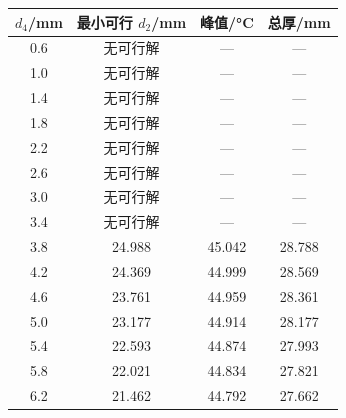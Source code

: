 \begin{tabular}{cccc}
  \toprule
    $d_4$/\si{mm} & 最小可行 $d_2$/\si{mm} & 峰值/\si{\celsius} & 总厚/\si{mm} \\
  \midrule
    0.6 & 无可行解 & --- & --- \\
    1.0 & 无可行解 & --- & --- \\
    1.4 & 无可行解 & --- & --- \\
    1.8 & 无可行解 & --- & --- \\
    2.2 & 无可行解 & --- & --- \\
    2.6 & 无可行解 & --- & --- \\
    3.0 & 无可行解 & --- & --- \\
    3.4 & 无可行解 & --- & --- \\
    3.8 & 24.988 & 45.042 & 28.788 \\
    4.2 & 24.369 & 44.999 & 28.569 \\
    4.6 & 23.761 & 44.959 & 28.361 \\
    5.0 & 23.177 & 44.914 & 28.177 \\
    5.4 & 22.593 & 44.874 & 27.993 \\
    5.8 & 22.021 & 44.834 & 27.821 \\
    6.2 & 21.462 & 44.792 & 27.662 \\
  \bottomrule
\end{tabular}
